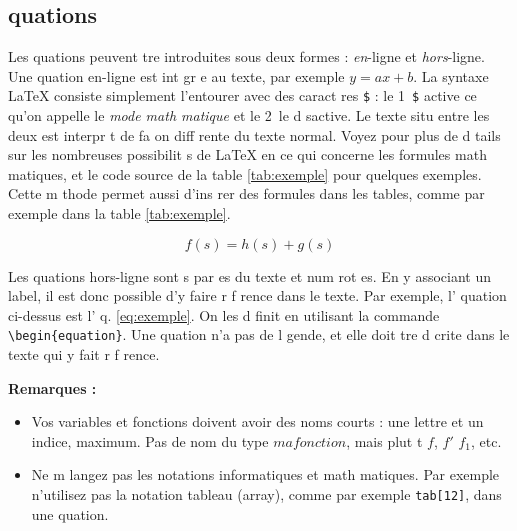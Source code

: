 \documentclass{article}
\begin{document}
\subsection{ quations}
\label{sec:equations}
Les  quations peuvent  tre introduites sous deux formes : \textit{en}-ligne et \textit{hors}-ligne. Une  quation en-ligne est int gr e au texte, par exemple $y=ax+b$. La syntaxe \LaTeX{} consiste simplement   l'entourer avec des caract res \texttt{\$} : le 1\ier~\texttt{\$} active ce qu'on appelle le \textit{mode math matique} et le 2\ieme~le d sactive. Le texte situ  entre les deux est interpr t  de fa on diff rente du texte normal. Voyez \cite{Wikibooks2010, Wikibooks2011} pour plus de d tails sur les nombreuses possibilit s de \LaTeX{} en ce qui concerne les formules math matiques, et le code source de la table \ref{tab:exemple} pour quelques exemples. Cette m thode permet aussi d'ins rer des formules dans les tables, comme par exemple dans la table \ref{tab:exemple}.

\begin{equation}
	f(s)=h(s)+g(s)
	\label{eq:exemple}
\end{equation}

Les  quations hors-ligne sont s par es du texte et num rot es. En y associant un label, il est donc possible d'y faire r f rence dans le texte. Par exemple, l' quation ci-dessus est l' q. \ref{eq:exemple}. On les d finit en utilisant la commande \texttt{\textbackslash{}begin\{equation\}}. Une  quation n'a pas de l gende, et elle doit  tre d crite dans le texte qui y fait r f rence.

\textbf{Remarques :}
\begin{itemize}
	\item Vos variables et fonctions doivent avoir des noms courts : une lettre et un indice, maximum. Pas de nom du type ${mafonction}$, mais plut t $f$, $f'$ $f_1$, etc\@.
	\item Ne m langez pas les notations informatiques et math matiques. Par exemple n'utilisez pas la notation tableau (array), comme par exemple \texttt{tab[12]}, dans une  quation.
\end{itemize}
	
\end{document}
